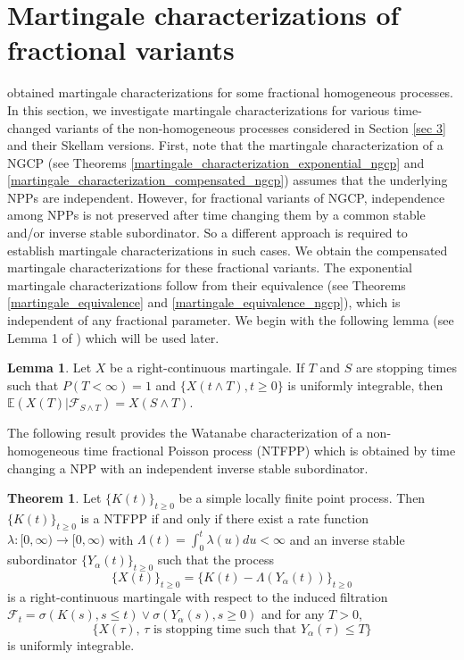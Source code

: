 \documentclass[11pt,oneside,reqno]{amsart}
\theoremstyle{definition}
\newtheorem{theorem}{\bf Theorem}[section]
\newtheorem{lemma}{Lemma}[section]
\theoremstyle{remarkstyle}
\begin{document}
\section{Martingale characterizations of fractional variants}\label{sec 4}
\citet{Tathe2025} obtained martingale characterizations for some fractional homogeneous processes. In this section, we investigate martingale characterizations for various time-changed variants of the non-homogeneous processes considered in Section \ref{sec 3} and their Skellam versions. First, note that the martingale characterization of a NGCP (see Theorems \ref{martingale_characterization_exponential_ngcp} and \ref{martingale_characterization_compensated_ngcp}) assumes that the underlying NPPs are independent. However, for fractional variants of NGCP, independence among NPPs is not preserved after time changing them by a common stable and/or inverse stable subordinator. So a different approach is required to establish martingale characterizations in such cases. We obtain the compensated martingale characterizations for these fractional variants. The exponential martingale characterizations follow from their equivalence (see Theorems \ref{martingale_equivalence} and \ref{martingale_equivalence_ngcp}), which is independent of any fractional parameter. We begin with the following lemma (see Lemma 1 of \citet{Aletti2018}) which will be used later.
\begin{lemma}\label{martingale_lemma}
    Let $X$ be a right-continuous martingale. If $T$ and $S$ are stopping times such that $P(T<\infty)=1$ and $\{X(t\wedge T),t\ge 0\}$ is uniformly integrable, then $\mathbb{E}(X(T)|\mathcal{F}_{S\wedge T})=X(S\wedge T)$.
\end{lemma}
The following result provides the Watanabe characterization of a non-homogeneous time fractional Poisson process (NTFPP) which is obtained by time changing a NPP with an independent inverse stable subordinator.
\begin{theorem}\label{Watanabe_characterization_NFPP}
    Let $\{K(t)\}_{t\ge 0}$ be a simple locally finite point process. Then $\{K(t)\}_{t\ge 0}$ is a NTFPP if and only if there exist a rate function $\lambda:[0,\infty)\to[0,\infty)$ with $\Lambda(t)=\int_{0}^{t}\lambda(u)du<\infty$ and an inverse stable subordinator $\{Y_{\alpha}(t)\}_{t\ge 0}$ such that the process 
    \begin{equation}\label{martingale_form_nfpp}
    \{X(t)\}_{t\ge 0}=\{K(t)-\Lambda(Y_{\alpha}(t))\}_{t\ge 0}    
    \end{equation} 
    is a right-continuous martingale with respect to the induced filtration $\mathcal{F}_t=\sigma\left(K(s),s\le t\right)\vee\sigma\left(Y_{\alpha}(s), s\ge 0\right)$ and for any $T>0$,
    \begin{equation}\label{stopping_times_martingale_nfpp}
        \{X(\tau),\,\tau\,\, \text{is stopping time such that}\,\,Y_{\alpha}(\tau)\le T\}
    \end{equation}
    is uniformly integrable.
\end{theorem}
\end{document}
